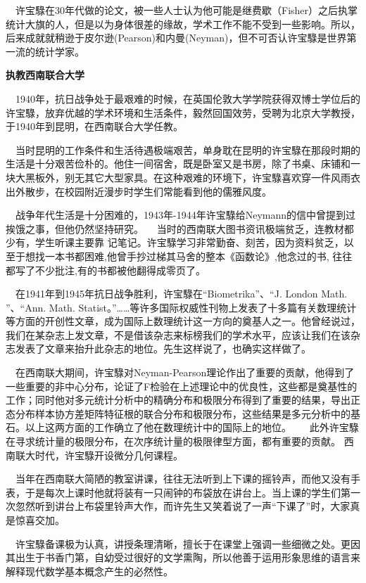 \documentclass[a4paper,AutoFakeBold,oneside,12pt]{article}
\begin{document}
$\quad$许宝騄在30年代做的论文，被一些人士认为他可能是继费歇（Fisher）之后执掌统计大旗的人，但是以为身体很差的缘故，学术工作不能不受到一些影响。所以，后来成就就稍逊于皮尔逊(Pearson)和内曼(Neyman)，但不可否认许宝騄是世界第一流的统计学家。

	\textbf{执教西南联合大学}

$\quad$1940年，抗日战争处于最艰难的时候，在英国伦敦大学学院获得双博士学位后的许宝騄，放弃优越的学术环境和生活条件，毅然回国效劳，受聘为北京大学教授，于1940年到昆明，在西南联合大学任教。

$\quad$当时昆明的工作条件和生活待遇极端艰苦，单身耽在昆明的许宝騄在那段时期的生活是十分艰苦俭朴的。他住一间宿舍，既是卧室又是书房，除了书桌、床铺和一块大黑板外，别无其它大型家具。在这种艰难的环境下，许宝騄喜欢穿一件风雨衣出外散步，在校园附近漫步时学生们常能看到他的儒雅风度。

$\quad$战争年代生活是十分困难的，1943年-1944年许宝騄给Neymann的信中曾提到过挨饿之事，但他仍然坚持研究。
	$\quad$当时的西南联大图书资讯极端贫乏，连教材都少有，学生听课主要靠 记笔记。许宝騄学习非常勤奋、刻苦，因为资料贫乏，以至于想找一本书都困难,他曾手抄过梯其马舍的整本《函数论》,他念过的书, 往往都写了不少批注,有的书都被他翻得成零页了。

$\quad$在1941年到1945年抗日战争胜利，许宝騄在“Biometrika”、“J. London Math. ”、“Ann. Math. Statist。”……等许多国际权威性刊物上发表了十多篇有关数理统计等方面的开创性文章，成为国际上数理统计这一方向的奠基人之一。他曾经说过，我们在某杂志上发文章，不是借该杂志来标榜我们的学术水平，应该让我们在该杂志发表了文章来抬升此杂志的地位。先生这样说了，也确实这样做了。

$\quad$在西南联大期间，许宝騄对Neyman-Pearson理论作出了重要的贡献，他得到了一些重要的非中心分布，论证了F检验在上述理论中的优良性，这些都是奠基性的工作；同时他对多元统计分析中的精确分布和极限分布得到了重要的结果，导出正态分布样本协方差矩阵特征根的联合分布和极限分布，这些结果是多元分析中的基石。以上这两方面的工作确立了他在数理统计中的国际上的地位。　
	$\quad$此外许宝騄在寻求统计量的极限分布，在次序统计量的极限律型方面，都有重要的贡献。
西南联大时代，许宝騄开设微分几何课程。

$\quad$当年在西南联大简陋的教室讲课，往往无法听到上下课的摇铃声，而他又没有手表，于是每次上课时他就将装有一只闹钟的布袋放在讲台上。当上课的学生们第一次忽然听到讲台上布袋里铃声大作，而许先生又笑着说了一声“下课了”时，大家真是惊喜交加。

$\quad$许宝騄备课极为认真，讲授条理清晰，擅长于在课堂上强调一些细微之处。更因其出生于书香门第，自幼受过很好的文学熏陶，所以他善于运用形象思维的语言来解释现代数学基本概念产生的必然性。 
\end{document}
